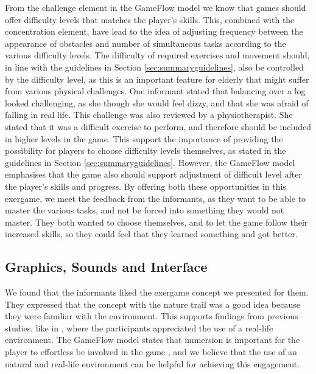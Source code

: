 From the challenge element in the GameFlow model we know that games should offer difficulty levels that matches the player's skills. This, combined with the concentration element, have lead to the idea of adjusting frequency between the appearance of obstacles and number of simultaneous tasks according to the various difficulty levels. The difficulty of required exercises and movement should, in line with the guidelines in Section \ref{sec:summaryguidelines}, also be controlled by the difficulty level, as this is an important feature for elderly that might suffer from various physical challenges. One informant stated that balancing over a log looked challenging, as she though she would feel dizzy, and that she was afraid of falling in real life. This challenge was also reviewed by a physiotherapist. She stated that it was a difficult exercise to perform, and therefore should be included in higher levels in the game. This support the importance of providing the possibility for players to choose difficulty levels themselves, as stated in the guidelines in Section \ref{sec:summaryguidelines}. However, the GameFlow model emphasises that the game also should support adjustment of difficult level after the player's skills and progress. By offering both these opportunities in this exergame, we meet the feedback from the informants, as they want to be able to master the various tasks, and not be forced into something they would not master. They both wanted to choose themselves, and to let the game follow their increased skills, so they could feel that they learned something and got better.  

\subsection{Graphics, Sounds and Interface}

We found that the informants liked the exergame concept we presented for them. They expressed that the concept with the nature trail was a good idea because they were familiar with the environment. This supports findings from previous studies, like in \cite{gerling2}, where the participants appreciated the use of a real-life environment. The GameFlow model states that immersion is important for the player to effortless be involved in the game \cite{sweetser}, and we believe that the use of an natural and real-life environment can be helpful for achieving this engagement. 

